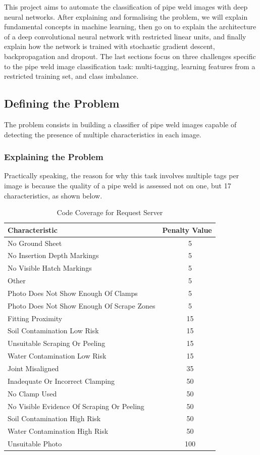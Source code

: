 \documentclass[a4paper,11pt]{article}
\begin{document}
This project aims to automate the classification of pipe weld images with deep neural networks. After explaining and formalising the problem, we will explain fundamental concepts in machine learning, then go on to explain the architecture of a deep convolutional neural network with restricted linear units, and finally explain how the network is trained with stochastic gradient descent, backpropagation and dropout. The last sections focus on three challenges specific to the pipe weld image classification task: multi-tagging, learning features from a restricted training set, and class imbalance.

\subsection{Defining the Problem}

The problem consists in building a classifier of pipe weld images capable of detecting the presence of multiple characteristics in each image. 

\subsubsection{Explaining the Problem}

Practically speaking, the reason for why this task involves multiple tags per image is because the quality of a pipe weld is assessed not on one, but 17 characteristics, as shown below.

\begin{table}[h]
   \centering
    \begin{tabular}{|l|c|}
    \hline
    Characteristic                 & Penalty Value  \\ \hline
    No Ground Sheet  & ~  5 \\
    No Insertion Depth Markings  & ~ 5 \\
    No Visible Hatch Markings  & ~ 5 \\
    Other  & ~  5 \\
    Photo Does Not Show Enough Of Clamps  & ~ 5 \\
    Photo Does Not Show Enough Of Scrape Zones  & ~ 5 \\
    Fitting Proximity  & ~  15 \\
    Soil Contamination Low Risk  & ~ 15 \\
    Unsuitable Scraping Or Peeling  & ~ 15 \\
    Water Contamination Low Risk  & ~ 15 \\
    Joint Misaligned  & ~  35 \\
    Inadequate Or Incorrect Clamping  & ~ 50 \\
    No Clamp Used  & ~  50 \\
    No Visible Evidence Of Scraping Or Peeling  & ~ 50 \\
    Soil Contamination High Risk  & ~ 50 \\
    Water Contamination High Risk  & ~ 50 \\
    Unsuitable Photo  & ~ 100 \\
    \hline
    \end{tabular}
    \caption {Code Coverage for Request Server}
\end{table} 
\end{document}
